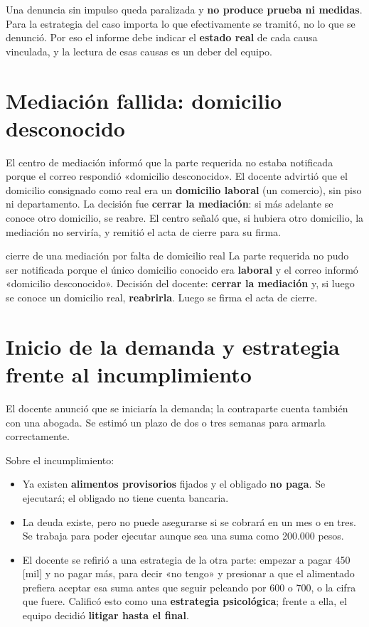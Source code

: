 \documentclass[12pt,oneside]{book}
\begin{document}
\begin{important}
Una denuncia sin impulso queda paralizada y \textbf{no produce prueba ni medidas}. Para la estrategia del caso importa lo que efectivamente se tramitó, no lo que se denunció. Por eso el informe debe indicar el \textbf{estado real} de cada causa vinculada, y la lectura de esas causas es un deber del equipo.
\end{important}

\section{Mediación fallida: domicilio desconocido}

El centro de mediación informó que la parte requerida no estaba notificada porque el correo respondió «domicilio desconocido». El docente advirtió que el domicilio consignado como real era un \textbf{domicilio laboral} (un comercio), sin piso ni departamento. La decisión fue \textbf{cerrar la mediación}: si más adelante se conoce otro domicilio, se reabre. El centro señaló que, si hubiera otro domicilio, la mediación no serviría, y remitió el acta de cierre para su firma.

\begin{example}{cierre de una mediación por falta de domicilio real}
La parte requerida no pudo ser notificada porque el único domicilio conocido era \textbf{laboral} y el correo informó «domicilio desconocido». Decisión del docente: \textbf{cerrar la mediación} y, si luego se conoce un domicilio real, \textbf{reabrirla}. Luego se firma el acta de cierre.
\end{example}

\section{Inicio de la demanda y estrategia frente al incumplimiento}

El docente anunció que se iniciaría la demanda; la contraparte cuenta también con una abogada. Se estimó un plazo de dos o tres semanas para armarla correctamente.

Sobre el incumplimiento:

\begin{itemize}
    \item Ya existen \textbf{alimentos provisorios} fijados y el obligado \textbf{no paga}. Se ejecutará; el obligado no tiene cuenta bancaria.
    \item La deuda existe, pero no puede asegurarse si se cobrará en un mes o en tres. Se trabaja para poder ejecutar aunque sea una suma como 200.000 pesos.
    \item El docente se refirió a una estrategia de la otra parte: empezar a pagar 450 [mil] y no pagar más, para decir «no tengo» y presionar a que el alimentado prefiera aceptar esa suma antes que seguir peleando por 600 o 700, o la cifra que fuere. Calificó esto como una \textbf{estrategia psicológica}; frente a ella, el equipo decidió \textbf{litigar hasta el final}.
\end{itemize}
\end{document}

